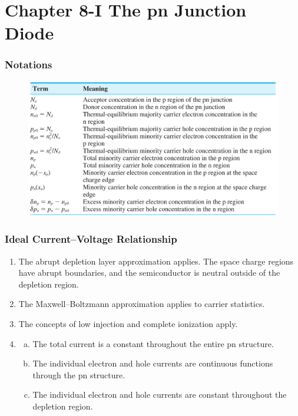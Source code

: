\documentclass{beamer}
\begin{document}
\section{Chapter 8-I The pn Junction Diode}
    \begin{frame} \frametitle{Notations}
        \begin{figure}[H]
            \centering
            \includegraphics[width=0.9\linewidth]{Chapter-8-notations.jpg}
            \label{fig:Chapter-8-notations.jpg}
        \end{figure}
    \end{frame}

    \begin{frame} \frametitle{Ideal Current–Voltage Relationship}
        \begin{enumerate}[1.]
            \item The abrupt depletion layer approximation applies. The space charge regions have abrupt boundaries, and the semiconductor is neutral outside of the depletion region.
            \item The Maxwell–Boltzmann approximation applies to carrier statistics. 
            \item The concepts of low injection and complete ionization apply.
            \item \begin{enumerate}[a)]
                \item The total current is a constant throughout the entire pn structure. 
                \item The individual electron and hole currents are continuous functions through the pn structure.
                \item The individual electron and hole currents are constant throughout the depletion region.
            \end{enumerate}
        \end{enumerate}
    \end{frame}
\end{document}
